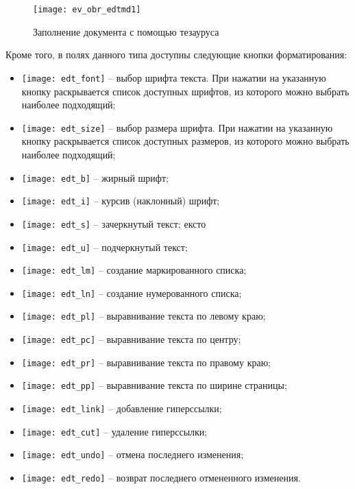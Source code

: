 {\begin{enumerate}
  \begin{figure}[ht!]\centering
   \texttt{[image: ev\_obr\_edtmd1]}
   \caption{Заполнение документа с помощью тезауруса}
   \label{img_ev_obr_edtmd1}
  \end{figure}
  
 Кроме того, в полях данного типа доступны следующие кнопки форматирования:
 
 \begin{itemize}
  \item \texttt{[image: edt\_font]} -- выбор шрифта текста. При нажатии на указанную кнопку раскрывается список доступных шрифтов, из которого можно выбрать наиболее подходящий;
  \item \texttt{[image: edt\_size]} -- выбор размера шрифта. При нажатии на указанную кнопку раскрывается список доступных размеров, из которого можно выбрать наиболее подходящий; 
  \item \texttt{[image: edt\_b]} -- жирный шрифт; 
  \item \texttt{[image: edt\_i]} -- курсив (наклонный) шрифт;
  \item \texttt{[image: edt\_s]} -- зачеркнутый текст; ексто
  \item \texttt{[image: edt\_u]} -- подчеркнутый текст;
  \item \texttt{[image: edt\_lm]} -- создание маркированного списка;
  \item \texttt{[image: edt\_ln]} -- создание нумерованного списка;
  \item \texttt{[image: edt\_pl]} -- выравнивание текста по левому краю;
  \item \texttt{[image: edt\_pc]} -- выравнивание текста по центру;
  \item \texttt{[image: edt\_pr]} -- выравнивание текста по правому краю;
  \item \texttt{[image: edt\_pp]} -- выравнивание текста по ширине страницы; 
  \item \texttt{[image: edt\_link]} -- добавление гиперссылки;
  \item \texttt{[image: edt\_cut]} -- удаление гиперссылки;
  \item \texttt{[image: edt\_undo]} -- отмена последнего изменения;
  \item \texttt{[image: edt\_redo]} -- возврат последнего отмененного изменения.      
 \end{itemize}
 

\end{enumerate}}
